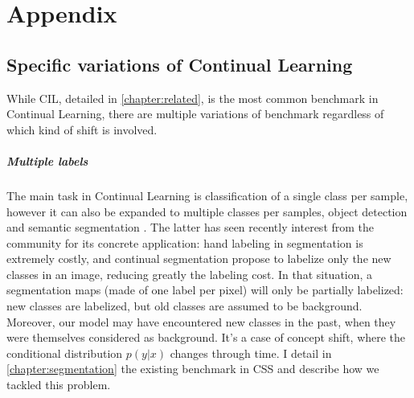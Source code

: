 \chapter{Appendix}
\label{chapter:appendix}

{}


\section{Specific variations of Continual Learning}
\label{sec:related_variation}

While \acf{CIL}, detailed in \autoref{chapter:related}, is the most common benchmark in Continual
Learning, there are multiple variations of benchmark regardless of which kind of shift is involved.

\label{sec:related_multiple_labels}

\paragraph{Multiple labels} The main task in Continual Learning is classification of a single class
per sample, however it can also be expanded to multiple classes per samples, \eg object detection
\citep{shmelkov2017incrementalobjectdetection} and semantic segmentation
\citep{michieli2019ilt,cermelli2020modelingthebackground}. The latter has seen recently interest
from the community for its concrete application: hand labeling in segmentation is extremely costly,
and continual segmentation propose to labelize only the new classes in an image, reducing greatly
the labeling cost. In that situation, a segmentation maps (made of one label per pixel) will only be
partially labelized: new classes are labelized, but old classes are assumed to be background.
Moreover, our model may have encountered new classes in the past, when they were themselves
considered as background. It's a case of concept shift, where the conditional distribution $p(y |
    x)$ changes through time. I detail in \autoref{chapter:segmentation} the existing benchmark in
\ac{CSS} and describe how we tackled this problem.

\label{sec:related_online_learning}

